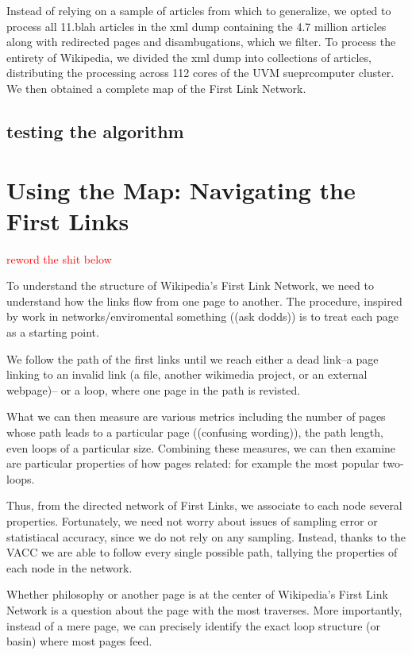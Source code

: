 \documentclass[twoside]{article}
\newcommand{\gray}[1]{{\leavevmode\color[gray]{0.5}{#1}}} %
\begin{document}
\begin{multicols}{2}
Instead of relying on a sample of articles from which to generalize, we opted to process all 11.blah articles in the xml dump containing the 4.7 million articles along with redirected pages and disambugations, which we filter. To process the entirety of Wikipedia, we divided the xml dump into collections of articles, distributing the processing across 112 cores of the UVM sueprcomputer cluster. We then obtained a complete map of the First Link Network.


\subsection*{testing the algorithm}
\section{Using the Map: Navigating the First Links}

\textcolor{red}{reword the shit below}
\gray{
quote analysis from other areas/dodds paper: Droplets accumulating\\
first paper by Dodds cites Horton-Strahler (leaf pruning) not drop accumulation
}

To understand the structure of Wikipedia's First Link Network, we need to understand how the links flow from one page to another. The procedure, inspired by work in networks/enviromental something ((ask dodds)) is to treat each page as a starting point.

We follow the path of the first links until we reach either a dead link--a page linking to an invalid link (a file, another wikimedia project, or an external webpage)-- or a loop, where one page in the path is revisted.

What we can then measure are various metrics including the number of pages whose path leads to a particular page ((confusing wording)), the path length, even loops of a particular size. Combining these measures, we can then examine are particular properties of how pages related: for example the most popular two-loops.

Thus, from the directed network of First Links, we associate to each node several properties. Fortunately, we need not worry about issues of sampling error or statistiacal accuracy, since we do not rely on any sampling. Instead, thanks to the VACC we are able to follow every single possible path, tallying the properties of each node in the network.

Whether philosophy or another page is at the center of Wikipedia's First Link Network is a question about the page with the most traverses. More importantly, instead of a mere page, we can precisely identify the exact loop structure (or basin) where most pages feed. 


\end{multicols}
\end{document}
